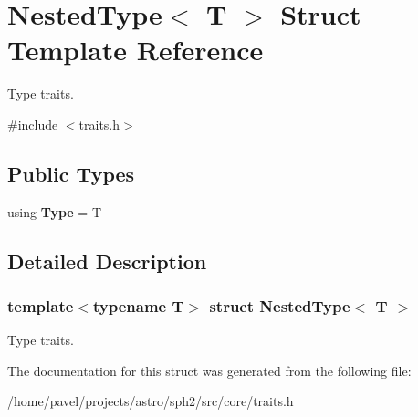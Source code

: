 \hypertarget{structNestedType}{}\section{Nested\+Type$<$ T $>$ Struct Template Reference}
\label{structNestedType}


Type traits.  




{\ttfamily \#include $<$traits.\+h$>$}

\subsection*{Public Types}
\begin{DoxyCompactItemize}
\item 
\hypertarget{structNestedType_a4275ea73323189a35f65e74feca39f05}{}\label{structNestedType_a4275ea73323189a35f65e74feca39f05} 
using {\bfseries Type} = T
\end{DoxyCompactItemize}


\subsection{Detailed Description}
\subsubsection*{template$<$typename T$>$\newline
struct Nested\+Type$<$ T $>$}

Type traits. 

The documentation for this struct was generated from the following file\+:\begin{DoxyCompactItemize}
\item 
/home/pavel/projects/astro/sph2/src/core/traits.\+h\end{DoxyCompactItemize}
